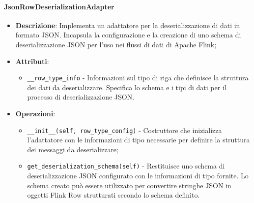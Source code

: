 \documentclass[10pt]{article}
\begin{document}
    \paragraph{JsonRowDeserializationAdapter}
    \begin{itemize} 
    \item \textbf{Descrizione}: Implementa un adattatore per la deserializzazione di dati in formato JSON. Incapsula la configurazione e la creazione di uno schema di deserializzazione JSON per l'uso nei flussi di dati di Apache Flink;
    \item \textbf{Attributi}:
    \begin{itemize}
        \item \texttt{\_\_row\_type\_info} - Informazioni sul tipo di riga che definisce la struttura dei dati da deserializzare. Specifica lo schema e i tipi di dati per il processo di deserializzazione JSON.
    \end{itemize}
    
    \item \textbf{Operazioni}:
    \begin{itemize}
        \item \texttt{\_\_init\_\_(self, row\_type\_config)} - Costruttore che inizializza l'adattatore con le informazioni di tipo necessarie per definire la struttura dei messaggi da deserializzare;
        
        \item \texttt{get\_deserialization\_schema(self)} - Restituisce uno schema di deserializzazione JSON configurato con le informazioni di tipo fornite. Lo schema creato può essere utilizzato per convertire stringhe JSON in oggetti Flink Row strutturati secondo lo schema definito.
    \end{itemize}
    \end{itemize}
\end{document}
